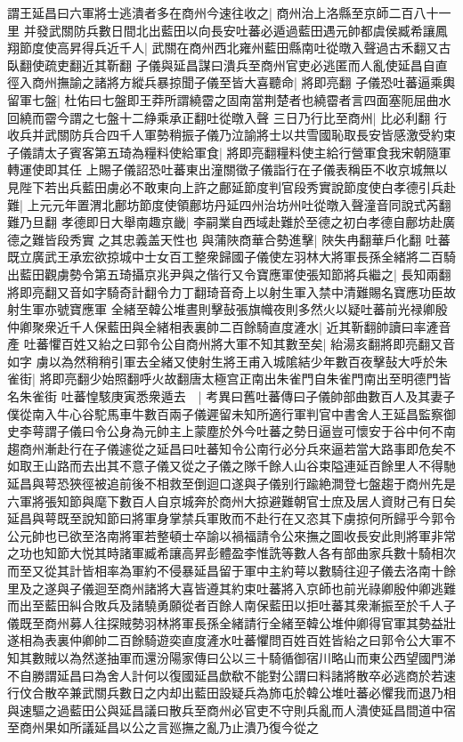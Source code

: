 謂王延昌曰六軍將士逃潰者多在商州今速往收之|{
	商州治上洛縣至京師二百八十一里}
并發武關防兵數日間北出藍田以向長安吐蕃必遁過藍田遇元帥都虞侯臧希讓鳳翔節度使高昇得兵近千人|{
	武關在商州西北雍州藍田縣南吐從暾入聲過古禾翻又古臥翻使疏吏翻近其靳翻}
子儀與延昌謀曰潰兵至商州官吏必逃匿而人亂使延昌自直徑入商州撫諭之諸將方縱兵暴掠聞子儀至皆大喜聽命|{
	將即亮翻}
子儀恐吐蕃逼乘輿留軍七盤|{
	杜佑曰七盤即王莽所謂繞霤之固南當荆楚者也繞霤者言四面塞阨屈曲水回繞而霤今謂之七盤十二䋫乘承正翻吐從暾入聲}
三日乃行比至商州|{
	比必利翻}
行收兵并武關防兵合四千人軍勢稍振子儀乃泣諭將士以共雪國恥取長安皆感激受約束子儀請太子賓客第五琦為糧料使給軍食|{
	將即亮翻糧料使主給行營軍食我宋朝隨軍轉運使即其任}
上賜子儀詔恐吐蕃東出潼關徵子儀詣行在子儀表稱臣不收京城無以見陛下若出兵藍田虜必不敢東向上許之鄜延節度判官段秀實說節度使白孝德引兵赴難|{
	上元元年置渭北鄜坊節度使領鄜坊丹延四州治坊州吐從暾入聲潼音同說式芮翻難乃旦翻}
孝德即日大舉南趣京畿|{
	李嗣業自西域赴難於至德之初白孝德自鄜坊赴廣德之難皆段秀實之其忠義盖天性也}
與蒲陜商華合勢進擊|{
	陜失冉翻華戶化翻}
吐蕃既立廣武王承宏欲掠城中士女百工整衆歸國子儀使左羽林大將軍長孫全緒將二百騎出藍田觀虜勢令第五琦攝京兆尹與之偕行又令寶應軍使張知節將兵繼之|{
	長知兩翻將即亮翻又音如字騎奇計翻令力丁翻琦音奇上以射生軍入禁中清難賜名寶應功臣故射生軍亦號寶應軍}
全緒至韓公堆晝則擊鼔張旗幟夜則多然火以疑吐蕃前光禄卿殷仲卿聚衆近千人保藍田與全緒相表裏帥二百餘騎直度滻水|{
	近其靳翻帥讀曰率滻音產}
吐蕃懼百姓又紿之曰郭令公自商州將大軍不知其數至矣|{
	紿湯亥翻將即亮翻又音如字}
虜以為然稍稍引軍去全緒又使射生將王甫入城隂結少年數百夜擊鼔大呼於朱雀街|{
	將即亮翻少始照翻呼火故翻唐太極宫正南出朱雀門自朱雀門南出至明德門皆名朱雀街}
吐蕃惶駭庚寅悉衆遁去　|{
	考異曰舊吐蕃傳曰子儀帥部曲數百人及其妻子僕從南入牛心谷駝馬車牛數百兩子儀遲留未知所適行軍判官中書舍人王延昌監察御史李萼謂子儀曰令公身為元帥主上蒙塵於外今吐蕃之勢日逼豈可懷安于谷中何不南趨商州漸赴行在子儀遽從之延昌曰吐蕃知令公南行必分兵來逼若當大路事即危矣不如取王山路而去出其不意子儀又從之子儀之隊千餘人山谷束隘連延百餘里人不得馳延昌與萼恐狹徑被追前後不相救至倒迴口遂與子儀别行踰絶澗登七盤趨于商州先是六軍將張知節與麾下數百人自京城奔於商州大掠避難朝官士庶及居人資財己有日矣延昌與萼既至說知節曰將軍身掌禁兵軍敗而不赴行在又恣其下虜掠何所歸乎今郭令公元帥也已欲至洛南將軍若整頓士卒諭以禍福請令公來撫之圖收長安此則將軍非常之功也知節大悦其時諸軍臧希讓高昇彭體盈李惟詵等數人各有部曲家兵數十騎相次而至又從其計皆相率為軍約不侵暴延昌留于軍中主約萼以數騎往迎子儀去洛南十餘里及之遂與子儀迴至商州諸將大喜皆遵其約束吐蕃將入京師也前光祿卿殷仲卿逃難而出至藍田糾合敗兵及諸驍勇願從者百餘人南保藍田以拒吐蕃其衆漸振至於千人子儀既至商州募人往探賊勢羽林將軍長孫全緒請行全緒至韓公堆仲卿得官軍其勢益壯遂相為表裏仲卿帥二百餘騎遊奕直度滻水吐蕃懼問百姓百姓皆紿之曰郭令公大軍不知其數賊以為然遂抽軍而還汾陽家傳曰公以三十騎循御宿川略山而東公西望國門涕不自勝謂延昌曰為舍人計何以復國延昌歔欷不能對公謂曰料諸將散卒必逃商於若速行伩合散卒兼武關兵數日之内却出藍田設疑兵為斾屯於韓公堆吐蕃必懼我而退乃相與速驅之過藍田公與延昌議曰散兵至商州必官吏不守則兵亂而人潰使延昌間道中宿至商州果如所議延昌以公之言廵撫之亂乃止潰乃復今從之}
